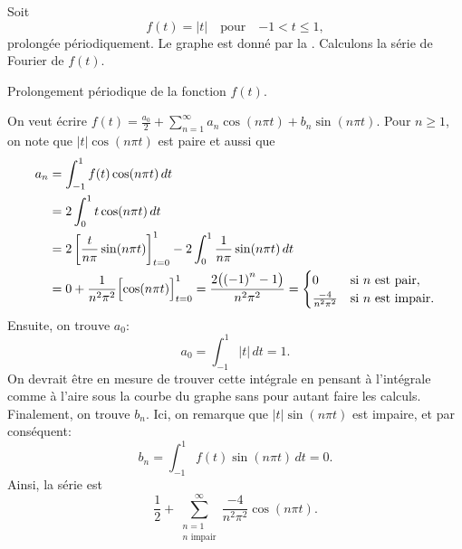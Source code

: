 \begin{example}
Soit
\begin{equation*}
f(t) =
\lvert t \rvert
\quad \text{pour} \quad {-1} < t \leq 1,
\end{equation*}
prolongée périodiquement.  Le graphe est donné par la .
Calculons la série de Fourier de $f(t)$.

\begin{myfig}
\capstart
{}
\caption{Prolongement périodique de la fonction $f(t)$.\label{gfs:sawcontfig}}
\end{myfig}

On veut écrire $f(t) = \frac{a_0}{2} + \sum_{n=1}^\infty a_n \cos (n \pi t) + b_n
\sin (n \pi t)$.  Pour $n \geq 1$, on note que $\lvert t \rvert \cos (n \pi t)$
est paire et aussi que
\begin{equation*}
\begin{split}
a_n & = \int_{-1}^1 f(t) \cos (n \pi t) \, dt \\
& = 2 \int_{0}^1 t \cos (n \pi t) \, dt \\
 & = 2 \left[ \frac{t}{n \pi} \sin (n \pi t) \right]_{t=0}^1 -
2 \int_{0}^1 \frac{1}{n \pi} \sin (n \pi t) \, dt \\
& =  0 + \frac{1}{n^2 \pi^2} \Bigl[ \cos (n \pi t) \Bigr]_{t=0}^1
 =  \frac{2 \bigl( {(-1)}^n -1 \bigr) }{n^2 \pi^2}
=
\begin{cases}
0 & \text{si } n \text{ est pair} , \\
\frac{-4 }{n^2 \pi^2} & \text{si } n \text{ est impair}  .
\end{cases}
\end{split}
\end{equation*}
Ensuite, on trouve $a_0$:
\begin{equation*}
a_0 = \int_{-1}^1 \lvert t \rvert \, dt 
=
1 .
\end{equation*}
On devrait être en mesure de trouver cette intégrale en pensant à l'intégrale comme à l'aire sous la courbe du graphe sans pour autant faire les calculs. Finalement, on trouve $b_n$.  Ici, on remarque que
$\lvert t \rvert \sin (n \pi t)$ est impaire, et par conséquent: 
\begin{equation*}
b_n = \int_{-1}^1 f(t) \sin (n \pi t) \, dt = 0 .
\end{equation*}
Ainsi, la série est
\begin{equation*}
\frac{1}{2} + 
\sum_{\substack{n=1 \\ n \text{ impair}}}^\infty \frac{-4}{n^2 \pi^2} \cos (n \pi t) .
\end{equation*}


\end{example}
